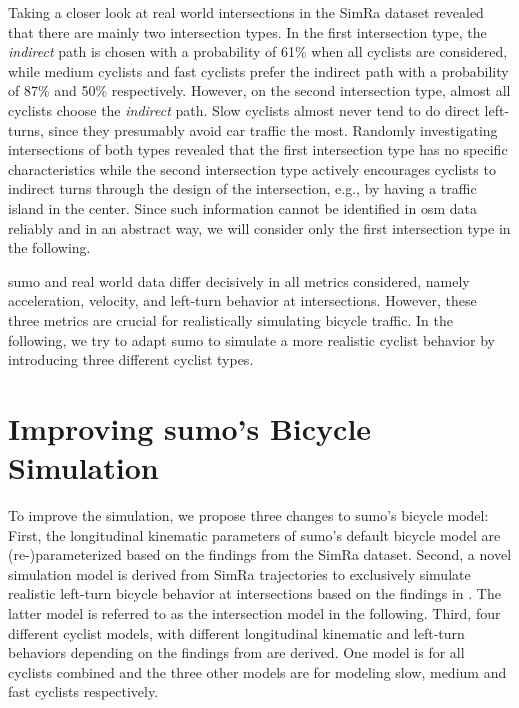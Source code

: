 Taking a closer look at real world intersections in the SimRa dataset revealed that there are mainly two intersection types.
In the first intersection type, the \textit{indirect} path is chosen with a probability of \num{61}\% when all cyclists are considered, while medium cyclists and fast cyclists prefer the indirect path with a probability of \num{87}\% and \num{50}\% respectively.
However, on the second intersection type, almost all cyclists choose the \textit{indirect} path.
Slow cyclists almost never tend to do direct left-turns, since they presumably avoid car traffic the most.
Randomly investigating intersections of both types revealed that the first intersection type has no specific characteristics while the second intersection type actively encourages cyclists to indirect turns through the design of the intersection, e.g., by having a traffic island in the center.
Since such information cannot be identified in \ac{osm} data reliably and in an abstract way, we will consider only the first intersection type in the following.

\ac{sumo} and real world data differ decisively in all metrics considered, namely acceleration, velocity, and left-turn behavior at intersections.
However, these three metrics are crucial for realistically simulating bicycle traffic.
In the following, we try to adapt \ac{sumo} to simulate a more realistic cyclist behavior by introducing three different cyclist types.


\section{Improving \ac{sumo}'s Bicycle Simulation}
\label{sec:improving_sumos_bicycle_simulation}
To improve the simulation, we propose three changes to \ac{sumo}'s bicycle model:
First, the longitudinal kinematic parameters of \ac{sumo}'s default bicycle model are \mbox{(re-)}parameterized based on the findings from the SimRa dataset.
Second, a novel simulation model is derived from SimRa trajectories to exclusively simulate realistic left-turn bicycle behavior at intersections based on the findings in .
The latter model is referred to as the intersection model in the following.
Third, four different cyclist models, with different longitudinal kinematic and left-turn behaviors depending on the findings from  are derived.
One model is for all cyclists combined and the three other models are for modeling slow, medium and fast cyclists respectively.


